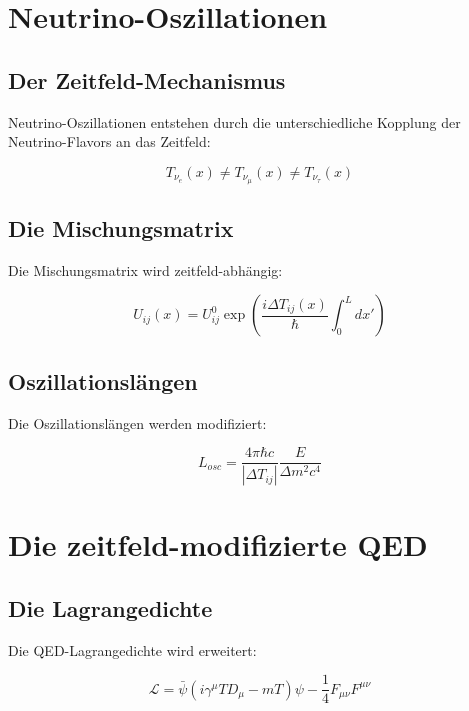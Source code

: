 \documentclass[12pt,a4paper]{report}
\begin{document}
	\section{Neutrino-Oszillationen}
	
	\subsection{Der Zeitfeld-Mechanismus}
	
	Neutrino-Oszillationen entstehen durch die unterschiedliche Kopplung der Neutrino-Flavors an das Zeitfeld:
	
	\begin{equation}
		T_{\nu_e}(x) \neq T_{\nu_\mu}(x) \neq T_{\nu_\tau}(x)
	\end{equation}
	
	\subsection{Die Mischungsmatrix}
	
	Die Mischungsmatrix wird zeitfeld-abhängig:
	
	\begin{equation}
		U_{ij}(x) = U_{ij}^0 \exp\left(\frac{i\Delta T_{ij}(x)}{\hbar}\int_0^L dx'\right)
	\end{equation}
	
	\subsection{Oszillationslängen}
	
	Die Oszillationslängen werden modifiziert:
	
	\begin{equation}
		L_{osc} = \frac{4\pi\hbar c}{|\Delta T_{ij}|}\frac{E}{\Delta m^2 c^4}
	\end{equation}
	
	\section{Die zeitfeld-modifizierte QED}
	
	\subsection{Die Lagrangedichte}
	
	Die QED-Lagrangedichte wird erweitert:
	
	\begin{equation}
		\mathcal{L} = \bar{\psi}(i\gamma^\mu T D_\mu - mT)\psi - \frac{1}{4}F_{\mu\nu}F^{\mu\nu}
	\end{equation}
	
\end{document}
